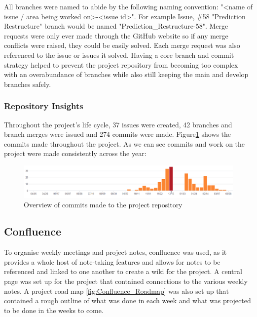             All branches were named to abide by the following naming convention: "<name of issue / area being worked on>-<issue id>". For example Issue, \#58 "Prediction Restructure" branch would be named "Prediction\_Restructure-58". Merge requests were only ever made through the GitHub website so if any merge conflicts were raised, they could be easily solved. Each merge request was also referenced to the issue or issues it solved. Having a core branch and commit strategy helped to prevent the project repository from becoming too complex with an overabundance of branches while also still keeping the main and develop branches safely.
            
            \subsubsection{Repository Insights}
            Throughout the project's life cycle, 37 issues were created, 42 branches and branch merges were issued and 274 commits were made. Figure\ref{fig:Git_commmits} shows the commits made throughout the project. As we can see commits and work on the project were made consistently across the year:
            
            \begin{figure}
                \centering
                \includegraphics[width=\linewidth]{images/Commits.png}
                \caption{Overview of commits made to the project repository}
                \label{fig:Git_commmits}
            \end{figure}
            
        \subsection{Confluence}
        To organise weekly meetings and project notes, confluence \citep{website:confluence} was used, as it provides a whole host of note-taking features and allows for notes to be referenced and linked to one another to create a wiki for the project. A central page was set up for the project that contained connections to the various weekly notes. A project road map \ref{fig:Confluence_Roadmap} was also set up that contained a rough outline of what was done in each week and what was projected to be done in the weeks to come. 
        
